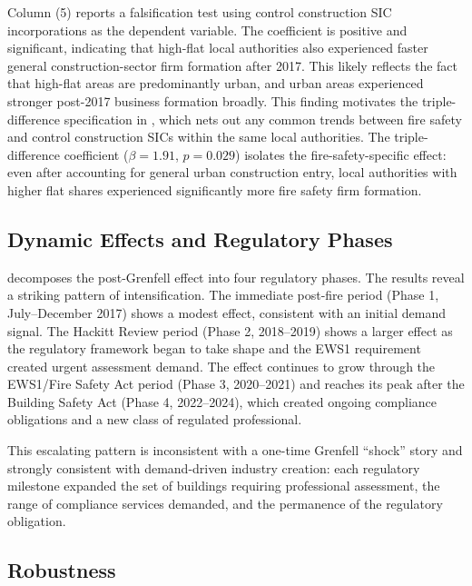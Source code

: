 \documentclass[12pt]{article}
\begin{document}
Column (5) reports a falsification test using control construction SIC incorporations as the dependent variable. The coefficient is positive and significant, indicating that high-flat local authorities also experienced faster general construction-sector firm formation after 2017. This likely reflects the fact that high-flat areas are predominantly urban, and urban areas experienced stronger post-2017 business formation broadly. This finding motivates the triple-difference specification in , which nets out any common trends between fire safety and control construction SICs within the same local authorities. The triple-difference coefficient ($\beta = 1.91$, $p = 0.029$) isolates the fire-safety-specific effect: even after accounting for general urban construction entry, local authorities with higher flat shares experienced significantly more fire safety firm formation.



\subsection{Dynamic Effects and Regulatory Phases}

 decomposes the post-Grenfell effect into four regulatory phases. The results reveal a striking pattern of intensification. The immediate post-fire period (Phase 1, July--December 2017) shows a modest effect, consistent with an initial demand signal. The Hackitt Review period (Phase 2, 2018--2019) shows a larger effect as the regulatory framework began to take shape and the EWS1 requirement created urgent assessment demand. The effect continues to grow through the EWS1/Fire Safety Act period (Phase 3, 2020--2021) and reaches its peak after the Building Safety Act (Phase 4, 2022--2024), which created ongoing compliance obligations and a new class of regulated professional.

This escalating pattern is inconsistent with a one-time Grenfell ``shock'' story and strongly consistent with demand-driven industry creation: each regulatory milestone expanded the set of buildings requiring professional assessment, the range of compliance services demanded, and the permanence of the regulatory obligation.



\subsection{Robustness}
\end{document}
